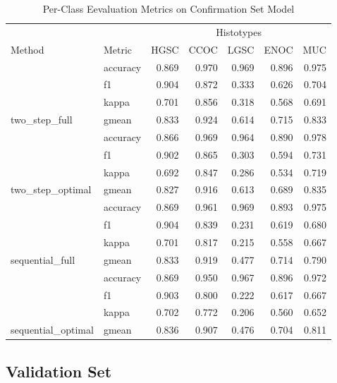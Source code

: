 \documentclass[
]{report}
\begin{document}
\begin{table}

\caption{\label{tab:conf-eval-per-class}Per-Class Eevaluation Metrics on Confirmation Set Model}
\centering
\begin{tabular}[t]{l|l|r|r|r|r|r}
\hline
\multicolumn{2}{c|}{ } & \multicolumn{5}{c}{Histotypes} \\
\cline{3-7}
Method & Metric & HGSC & CCOC & LGSC & ENOC & MUC\\
\hline
 & accuracy & 0.869 & 0.970 & 0.969 & 0.896 & 0.975\\
\cline{2-7}
 & f1 & 0.904 & 0.872 & 0.333 & 0.626 & 0.704\\
\cline{2-7}
 & kappa & 0.701 & 0.856 & 0.318 & 0.568 & 0.691\\
\cline{2-7}
\multirow{-4}{*}{\raggedright\arraybackslash two\_step\_full} & gmean & 0.833 & 0.924 & 0.614 & 0.715 & 0.833\\
\cline{1-7}
 & accuracy & 0.866 & 0.969 & 0.964 & 0.890 & 0.978\\
\cline{2-7}
 & f1 & 0.902 & 0.865 & 0.303 & 0.594 & 0.731\\
\cline{2-7}
 & kappa & 0.692 & 0.847 & 0.286 & 0.534 & 0.719\\
\cline{2-7}
\multirow{-4}{*}{\raggedright\arraybackslash two\_step\_optimal} & gmean & 0.827 & 0.916 & 0.613 & 0.689 & 0.835\\
\cline{1-7}
 & accuracy & 0.869 & 0.961 & 0.969 & 0.893 & 0.975\\
\cline{2-7}
 & f1 & 0.904 & 0.839 & 0.231 & 0.619 & 0.680\\
\cline{2-7}
 & kappa & 0.701 & 0.817 & 0.215 & 0.558 & 0.667\\
\cline{2-7}
\multirow{-4}{*}{\raggedright\arraybackslash sequential\_full} & gmean & 0.833 & 0.919 & 0.477 & 0.714 & 0.790\\
\cline{1-7}
 & accuracy & 0.869 & 0.950 & 0.967 & 0.896 & 0.972\\
\cline{2-7}
 & f1 & 0.903 & 0.800 & 0.222 & 0.617 & 0.667\\
\cline{2-7}
 & kappa & 0.702 & 0.772 & 0.206 & 0.560 & 0.652\\
\cline{2-7}
\multirow{-4}{*}{\raggedright\arraybackslash sequential\_optimal} & gmean & 0.836 & 0.907 & 0.476 & 0.704 & 0.811\\
\hline
\end{tabular}
\end{table}

\hypertarget{validation-set}{%
\subsection{Validation Set}\label{validation-set}}
\end{document}
